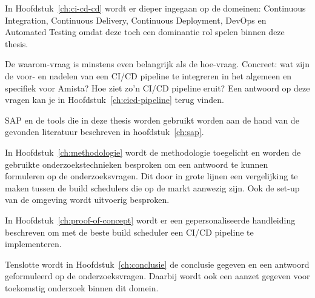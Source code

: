 In Hoofdstuk~\ref{ch:ci-cd-cd} wordt er dieper ingegaan op de domeinen: Continuous Integration, Continuous Delivery, Continuous Deployment, DevOps en Automated Testing omdat deze toch een dominantie rol spelen binnen deze thesis.

De waarom-vraag is minstens even belangrijk als de hoe-vraag. Concreet: wat zijn de voor- en nadelen van een CI/CD pipeline te integreren in het algemeen en specifiek voor Amista? Hoe ziet zo'n CI/CD pipeline eruit? Een antwoord op deze vragen kan je in Hoofdstuk~\ref{ch:cicd-pipeline} terug vinden.

SAP en de tools die in deze thesis worden gebruikt worden aan de hand van de gevonden literatuur beschreven in hoofdstuk~\ref{ch:sap}.

In Hoofdstuk~\ref{ch:methodologie} wordt de methodologie toegelicht en worden de gebruikte onderzoekstechnieken besproken om een antwoord te kunnen formuleren op de onderzoeksvragen. Dit door in grote lijnen een vergelijking te maken tussen de build schedulers die op de markt aanwezig zijn. Ook de set-up van de omgeving wordt uitvoerig besproken.

In Hoofdstuk~\ref{ch:proof-of-concept} wordt er een gepersonaliseerde handleiding beschreven om met de beste build scheduler een CI/CD pipeline te implementeren.

Tenslotte wordt in Hoofdstuk~\ref{ch:conclusie} de conclusie gegeven en een antwoord geformuleerd op de onderzoeksvragen. Daarbij wordt ook een aanzet gegeven voor toekomstig onderzoek binnen dit domein.